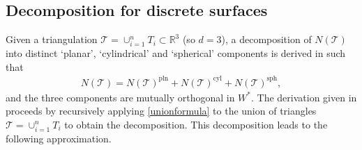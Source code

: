 \documentclass[sn-mathphys-num]{sn-jnl}%
\theoremstyle{thmstyleone}%
\theoremstyle{thmstyletwo}%
\theoremstyle{thmstylethree}%
\numberwithin{remark}{section}
\numberwithin{definition}{section}
\numberwithin{equation}{section}
\numberwithin{theorem}{section}
\newcommand{\R}{\ensuremath{\mathbb{R}}}%
\begin{document}
\subsection{Decomposition for discrete surfaces}
 Given a triangulation $\mathcal{T} = \cup_{i=1}^{n}{T_{i}} \subset \R^{3}$ (so $d=3$), a decomposition of $N(\mathcal{T})$ into distinct `planar', `cylindrical' and `spherical' components is derived in \cite{NCThesis} such that
\begin{align}\label{NC_decomp}
    N(\mathcal{T}) = N(\mathcal{T})^{\mathrm{\mathrm{pln}}} + N(\mathcal{T})^{\mathrm{\mathrm{cyl}}} + N(\mathcal{T})^{\mathrm{\mathrm{sph}}},
\end{align}   
and the three components are mutually orthogonal in $W^{*}$. The derivation given in \cite{NCThesis}  proceeds by recursively applying \cref{unionformula} to the union of triangles $\mathcal{T}=\cup_{i=1}^{n}{T_{i}}$ to obtain the decomposition. 
This decomposition leads to the following approximation.
\end{document}
